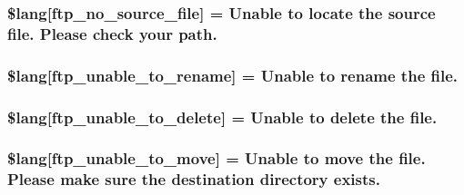 \subsubsection[{\$lang}]{\setlength{\rightskip}{0pt plus 5cm}\$lang\mbox{[}\textquotesingle{}ftp\+\_\+no\+\_\+source\+\_\+file\textquotesingle{}\mbox{]} = \textquotesingle{}Unable to locate the source file. Please check your path.\textquotesingle{}}\label{_admin_2system_2language_2english_2ftp__lang_8php_abf3e74ee1af13c9b0f0cc63fbb9081f1}
\hypertarget{_admin_2system_2language_2english_2ftp__lang_8php_ae2715b036a8015f4da2841c15ab8db79}{}
\subsubsection[{\$lang}]{\setlength{\rightskip}{0pt plus 5cm}\$lang\mbox{[}\textquotesingle{}ftp\+\_\+unable\+\_\+to\+\_\+rename\textquotesingle{}\mbox{]} = \textquotesingle{}Unable to rename the file.\textquotesingle{}}\label{_admin_2system_2language_2english_2ftp__lang_8php_ae2715b036a8015f4da2841c15ab8db79}
\hypertarget{_admin_2system_2language_2english_2ftp__lang_8php_a922b1d7a3667e2cacb0873788e548dca}{}
\subsubsection[{\$lang}]{\setlength{\rightskip}{0pt plus 5cm}\$lang\mbox{[}\textquotesingle{}ftp\+\_\+unable\+\_\+to\+\_\+delete\textquotesingle{}\mbox{]} = \textquotesingle{}Unable to delete the file.\textquotesingle{}}\label{_admin_2system_2language_2english_2ftp__lang_8php_a922b1d7a3667e2cacb0873788e548dca}
\hypertarget{_admin_2system_2language_2english_2ftp__lang_8php_a72178091982e6697b12337601213fa76}{}
\subsubsection[{\$lang}]{\setlength{\rightskip}{0pt plus 5cm}\$lang\mbox{[}\textquotesingle{}ftp\+\_\+unable\+\_\+to\+\_\+move\textquotesingle{}\mbox{]} = \textquotesingle{}Unable to move the file. Please make sure the destination directory exists.\textquotesingle{}}\label{_admin_2system_2language_2english_2ftp__lang_8php_a72178091982e6697b12337601213fa76}
